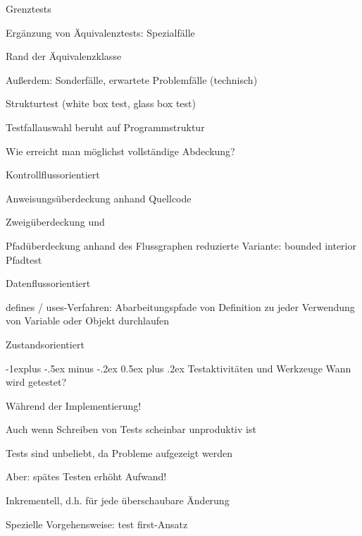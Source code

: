 \documentclass[a4paper]{article}
\makeatletter
\renewcommand{\subsection}{\@startsection{subsection}{2}{0mm}%
                                {-1explus -.5ex minus -.2ex}%
                                {0.5ex plus .2ex}%
                                {\normalfont\normalsize\bfseries}}
\makeatother
\begin{document}
\begin{multicols}{3}
  Grenztests
  \begin{itemize*}
    \item Ergänzung von Äquivalenztests: Spezialfälle
    \item Rand der Äquivalenzklasse
    \item Außerdem: Sonderfälle, erwartete Problemfälle (technisch)
  \end{itemize*}

  Strukturtest (white box test, glass box test)
  \begin{itemize*}
    \item Testfallauswahl beruht auf Programmstruktur
    \item Wie erreicht man möglichst vollständige Abdeckung?
    \item Kontrollflussorientiert
    \begin{itemize*}
      \item Anweisungsüberdeckung anhand Quellcode
      \item Zweigüberdeckung und
      \item Pfadüberdeckung anhand des Flussgraphen reduzierte Variante: bounded interior Pfadtest
    \end{itemize*}
    \item Datenflussorientiert
    \begin{itemize*}
      \item defines / uses-Verfahren: Abarbeitungspfade von Definition zu jeder Verwendung von Variable oder Objekt durchlaufen
    \end{itemize*}
    \item Zustandsorientiert
  \end{itemize*}

  \subsection{Testaktivitäten und Werkzeuge}
  Wann wird getestet?
  \begin{itemize*}
    \item Während der Implementierung!
    \begin{itemize*}
      \item Auch wenn Schreiben von Tests scheinbar unproduktiv ist
      \item Tests sind unbeliebt, da Probleme aufgezeigt werden
      \item Aber: spätes Testen erhöht Aufwand!
    \end{itemize*}
    \item Inkrementell, d.h. für jede überschaubare Änderung
    \item Spezielle Vorgehensweise: test first-Ansatz
  \end{itemize*}


\end{multicols}
\end{document}
